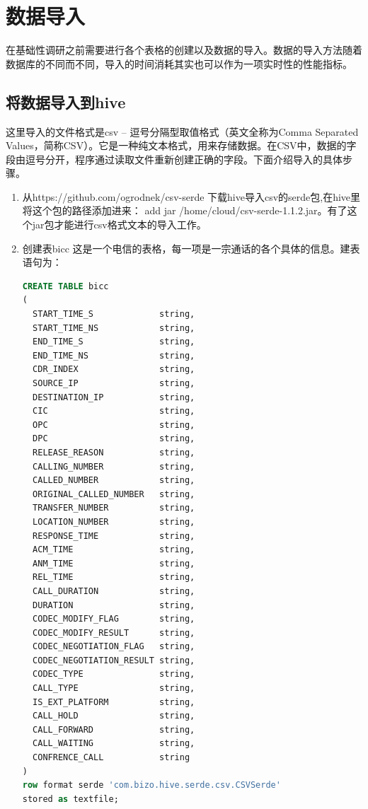 \section{数据导入}
在基础性调研之前需要进行各个表格的创建以及数据的导入。数据的导入方法随着数据库的不同而不同，导入的时间消耗其实也可以作为一项实时性的性能指标。

\subsection{将数据导入到hive}
  这里导入的文件格式是csv -- 逗号分隔型取值格式（英文全称为Comma Separated Values，简称CSV）。它是一种纯文本格式，用来存储数据。在CSV中，数据的字段由逗号分开，程序通过读取文件重新创建正确的字段。下面介绍导入的具体步骤。

\begin{enumerate}

\item 从https://github.com/ogrodnek/csv-serde 下载hive导入csv的serde包,在hive里将这个包的路径添加进来： add jar /home/cloud/csv-serde-1.1.2.jar。有了这个jar包才能进行csv格式文本的导入工作。

\item 创建表bicc
这是一个电信的表格，每一项是一宗通话的各个具体的信息。建表语句为：

\begin{lstlisting}[language=SQL]
CREATE TABLE bicc
(
  START_TIME_S             string,
  START_TIME_NS            string,
  END_TIME_S               string,
  END_TIME_NS              string,
  CDR_INDEX                string,
  SOURCE_IP                string,
  DESTINATION_IP           string,
  CIC                      string,
  OPC                      string,
  DPC                      string,
  RELEASE_REASON           string,
  CALLING_NUMBER           string,
  CALLED_NUMBER            string,
  ORIGINAL_CALLED_NUMBER   string,
  TRANSFER_NUMBER          string,
  LOCATION_NUMBER          string,
  RESPONSE_TIME            string,
  ACM_TIME                 string,
  ANM_TIME                 string,
  REL_TIME                 string,
  CALL_DURATION            string,
  DURATION                 string,
  CODEC_MODIFY_FLAG        string,
  CODEC_MODIFY_RESULT      string,
  CODEC_NEGOTIATION_FLAG   string,
  CODEC_NEGOTIATION_RESULT string,
  CODEC_TYPE               string,
  CALL_TYPE                string,
  IS_EXT_PLATFORM          string,
  CALL_HOLD                string,
  CALL_FORWARD             string,
  CALL_WAITING             string,
  CONFRENCE_CALL           string
)
row format serde 'com.bizo.hive.serde.csv.CSVSerde'
stored as textfile;
\end{lstlisting}


\end{enumerate}
